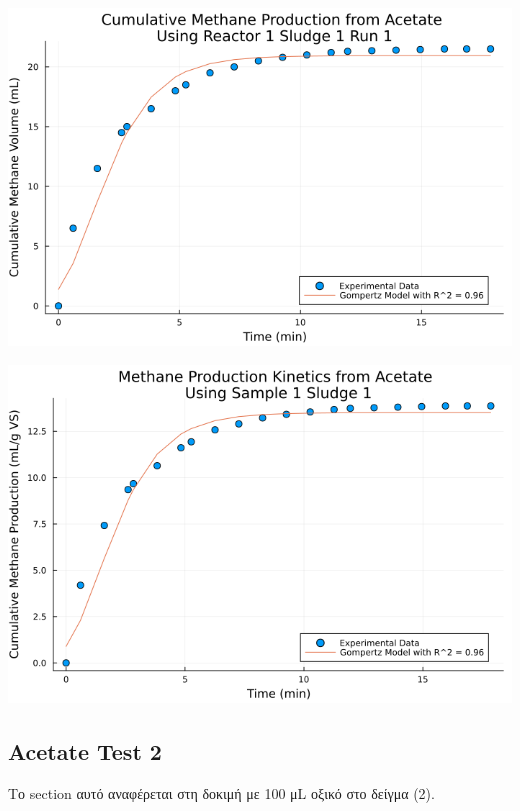 \documentclass[11pt]{article}
\begin{document}
\begin{center}
\includegraphics[width=.9\linewidth]{../plots/BMPs/Acetate/methane_kinetics_acet_test_1_s1_min.png}
\end{center}

\begin{center}
\includegraphics[width=.9\linewidth]{../plots/BMPs/Acetate/specific_methane_kinetics_acet_test_1_s1.png}
\end{center}

\subsection{Acetate Test 2}
\label{sec:orgf582d57}
Το section αυτό αναφέρεται στη δοκιμή με 100 μL οξικό στο δείγμα (2).
\end{document}
